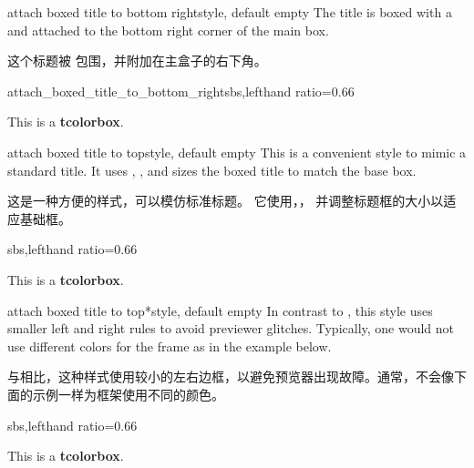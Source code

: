 \begin{docTcbKey}{attach boxed title to bottom right}{}{style, default empty}
The title is boxed with a  and attached to
the bottom right corner of the main box.

这个标题被  包围，并附加在主盒子的右下角。
\begin{exdispExample*}{attach_boxed_title_to_bottom_right}{sbs,lefthand ratio=0.66}
\begin{tcolorbox}[enhanced,title=My title,
  attach boxed title to bottom right]
  This is a \textbf{tcolorbox}.
\end{tcolorbox}
\end{exdispExample*}
\end{docTcbKey}


\begin{docTcbKey}[][doc new=2016-02-26]{attach boxed title to top}{}{style, default empty}
  This is a convenient style to mimic a standard title.
  It uses ,
  , and sizes the boxed title to match
  the base box.

这是一种方便的样式，可以模仿标准标题。 它使用，， 并调整标题框的大小以适应基础框。
\begin{dispExample*}{sbs,lefthand ratio=0.66}
\begin{tcolorbox}[enhanced,title=My title,
  attach boxed title to top,
  boxed title style={colframe=red}]
  This is a \textbf{tcolorbox}.
\end{tcolorbox}
\end{dispExample*}
\end{docTcbKey}

\begin{docTcbKey}[][doc new=2016-02-26]{attach boxed title to top*}{}{style, default empty}
  In contrast to , this style
  uses smaller left and right rules to avoid previewer glitches.
  Typically, one would not use different colors for the frame as in the
  example below.

与相比，这种样式使用较小的左右边框，以避免预览器出现故障。通常，不会像下面的示例一样为框架使用不同的颜色。
\begin{dispExample*}{sbs,lefthand ratio=0.66}
\begin{tcolorbox}[enhanced,title=My title,
  attach boxed title to top*,
  boxed title style={colframe=red}]
  This is a \textbf{tcolorbox}.
\end{tcolorbox}
\end{dispExample*}
\end{docTcbKey}

